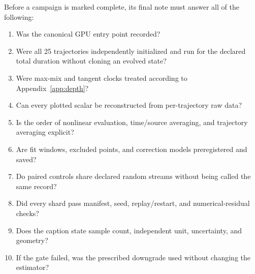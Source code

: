 \documentclass[aps,prx,twocolumn,floatfix,nofootinbib,superscriptaddress,longbibliography]{revtex4-2}
\begin{document}
Before a campaign is marked complete, its final note must answer all of the following:
\begin{enumerate}
\item Was the canonical GPU entry point recorded?
\item Were all 25 trajectories independently initialized and run for the declared total
      duration without cloning an evolved state?
\item Were max-mix and tangent clocks treated according to Appendix~\ref{app:depth}?
\item Can every plotted scalar be reconstructed from per-trajectory raw data?
\item Is the order of nonlinear evaluation, time/source averaging, and trajectory averaging explicit?
\item Are fit windows, excluded points, and correction models preregistered and saved?
\item Do paired controls share declared random streams without being called the same record?
\item Did every shard pass manifest, seed, replay/restart, and numerical-residual checks?
\item Does the caption state sample count, independent unit, uncertainty, and geometry?
\item If the gate failed, was the prescribed downgrade used without changing the estimator?
\end{enumerate}



\end{document}

